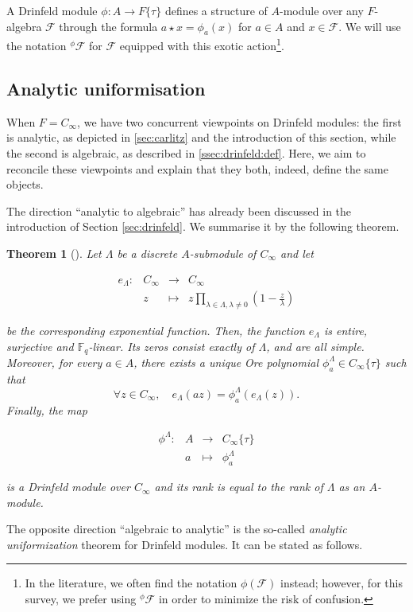\documentclass[11pt]{article}
\newtheorem{theorem}{Theorem}[section]
\theoremstyle{definition}
\newcommand{\Function}[5]{
  \[
    \begin{array}{rrcl}
    #1: & #2 & \to     & #3 \\
        & #4 & \mapsto & #5
    \end{array}
  \]
}
\newcommand{\EqFunction}[6]{
  \begin{equation}
    \label{#6}
    \begin{array}{rrcl}
    #1: & #2 & \to     & #3 \\
        & #4 & \mapsto & #5
    \end{array}
  \end{equation}
}
\newcommand\Fq{\mathbb{F}_q}
\newcommand{\Cinf}{C_{\infty}}
\newcommand{\phiact}[1]{{}^\phi\! #1}
\begin{document}
A Drinfeld module $\phi : A \to F\{\tau\}$ defines a structure of
$A$-module over any $F$-algebra $\mathcal F$ through the formula
$a \star x = \phi_a(x)$ for $a \in A$ and $x \in \mathcal F$. We will use the notation $\phiact{\mathcal F}$ for $\mathcal F$ 
equipped with this exotic action\footnote{In the literature, we often
find the notation $\phi(\mathcal F)$ instead; however, for this survey, 
we prefer using $\phiact{\mathcal F}$ in order to minimize the risk of confusion.}.

\subsection{Analytic uniformisation}
\label{ssec:drinfeld:uniformization}

When $F = \Cinf$, we have two concurrent viewpoints on Drinfeld modules: the first is analytic, as depicted in \cref{sec:carlitz} and the introduction of this section, while the second is algebraic, as described in \cref{ssec:drinfeld:def}.
Here, we aim to reconcile these viewpoints and explain that they both, indeed, define the same objects.

The direction ``analytic to algebraic'' has already been discussed in the introduction of Section \ref{sec:drinfeld}. We summarise it by the following theorem.

\begin{theorem}[]
Let $\Lambda$ be a discrete $A$-submodule of $\Cinf$ and let
\Function
  {e_\Lambda}
  {\Cinf}
  {\Cinf}
  {z}
  {\displaystyle z\prod_{\lambda \in \Lambda, \lambda \neq 0} \left (1-\frac{z}{\lambda}\right)}
be the corresponding exponential function.
Then, the function $e_\Lambda$ is entire, surjective and $\Fq$-linear.
Its zeros consist exactly of $\Lambda$, and are all simple.
Moreover, for every $a \in A$, there exists a unique Ore polynomial
$\phi_a^{\Lambda} \in \Cinf\{\tau\}$ such that
\begin{equation}\label{eq:A-mod-structure}
    \forall z \in \Cinf, 
    \quad e_\Lambda (az) = \phi_a^{\Lambda} (e_\Lambda (z)).
\end{equation}
Finally, the map
\EqFunction
  {\phi^\Lambda}
  {A}
  {\Cinf\{\tau\}}
  {a}
  {\phi_a^\Lambda}
  {eq:somelabelnamequinestjamaisutilise}
is a Drinfeld module over $\Cinf$ and its rank is equal to the 
rank of $\Lambda$ as an $A$-module.
\end{theorem}

The opposite direction ``algebraic to analytic'' is the so-called
\emph{analytic uniformization} theorem for Drinfeld modules. It can be
stated as follows.
\end{document}
